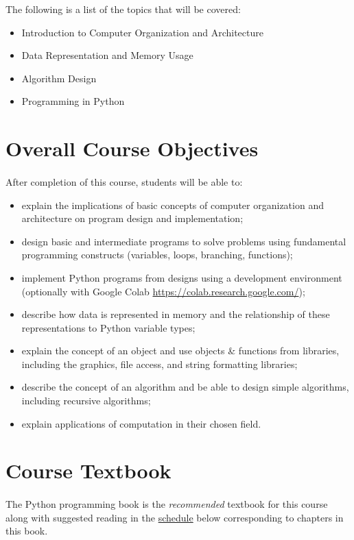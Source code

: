 \documentclass[letter,10pt]{article}
\begin{document}
The following is a list of the topics that will be covered:
\begin{itemize}
\item Introduction to Computer Organization and Architecture
\item Data Representation and Memory Usage
\item Algorithm Design
\item Programming in Python
\end{itemize}

\section*{Overall Course Objectives}
\paragraph{}After completion of this course, students will be able to:
\begin{itemize}
    \item explain the implications of basic concepts of computer organization and architecture on program design and implementation;
    \item design basic and intermediate programs to solve problems using fundamental programming constructs (variables, loops, branching, functions);
    \item implement Python programs from designs using a development environment (optionally with Google Colab \url{https://colab.research.google.com/});
    \item describe how data is represented in memory and the relationship of these representations to Python variable types;
    \item explain the concept of an object and use objects \& functions from libraries, including the graphics, file access, and string formatting libraries;
    \item describe the concept of an algorithm and be able to design simple algorithms, including recursive algorithms;
    \item explain applications of computation in their chosen field.
\end{itemize}

\section*{Course Textbook}
\paragraph{}The Python programming book is the \textit{recommended} textbook for this course along with suggested reading in the \hyperlink{sec:sechedule}{schedule} below corresponding to chapters in this book.
\end{document}
